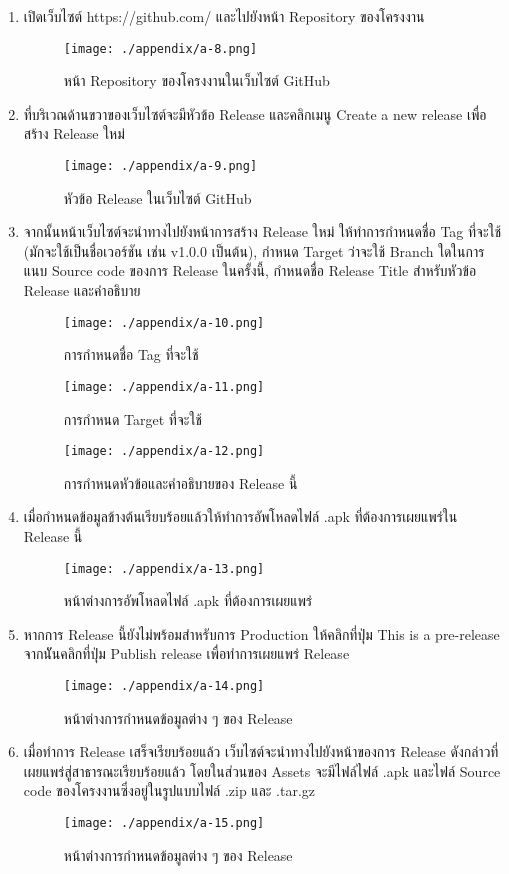 \begin{enumerate}
    \item เปิดเว็บไซต์ https://github.com/ และไปยังหน้า Repository ของโครงงาน
    \begin{figure}
        \texttt{[image: ./appendix/a-8.png]}
        \caption{หน้า Repository ของโครงงานในเว็บไซต์ GitHub}
    \end{figure}
    \item ที่บริเวณด้านขวาของเว็บไซต์จะมีหัวข้อ Release และคลิกเมนู Create a new release เพื่อสร้าง Release ใหม่
    \begin{figure}
        \texttt{[image: ./appendix/a-9.png]}
        \caption{หัวข้อ Release ในเว็บไซต์ GitHub}
    \end{figure}
    \item จากนั้นหน้าเว็บไซต์จะนำทางไปยังหน้าการสร้าง Release ใหม่ ให้ทำการกำหนดชื่อ Tag ที่จะใช้ (มักจะใช้เป็นชื่อเวอร์ชัน เช่น v1.0.0 เป็นต้น), กำหนด Target ว่าจะใช้ Branch ใดในการแนบ Source code ของการ Release ในครั้งนี้, กำหนดชื่อ Release Title สำหรับหัวข้อ Release และคำอธิบาย
    \begin{figure}
        \texttt{[image: ./appendix/a-10.png]}
        \caption{การกำหนดชื่อ Tag ที่จะใช้}
    \end{figure}
    \begin{figure}
        \texttt{[image: ./appendix/a-11.png]}
        \caption{การกำหนด Target ที่จะใช้}
    \end{figure}
    \begin{figure}
        \texttt{[image: ./appendix/a-12.png]}
        \caption{การกำหนดหัวข้อและคำอธิบายของ Release นี้}
    \end{figure}
    \item เมื่อกำหนดข้อมูลข้างต้นเรียบร้อยแล้วให้ทำการอัพโหลดไฟล์ .apk ที่ต้องการเผยแพร่ใน Release นี้
    \begin{figure}
        \texttt{[image: ./appendix/a-13.png]}
        \caption{หน้าต่างการอัพโหลดไฟล์ .apk ที่ต้องการเผยแพร่}
    \end{figure}
    \item หากการ Release นี้ยังไม่พร้อมสำหรับการ Production ให้คลิกที่ปุ่ม This is a pre-release จากนัันคลิกที่ปุ่ม Publish release เพื่อทำการเผยแพร่ Release
    \begin{figure}
        \texttt{[image: ./appendix/a-14.png]}
        \caption{หน้าต่างการกำหนดข้อมูลต่าง ๆ ของ Release}
    \end{figure}
    \item เมื่อทำการ Release เสร็จเรียบร้อยแล้ว เว็บไซต์จะนำทางไปยังหน้าของการ Release ดังกล่าวที่เผยแพร่สู่สาธารณะเรียบร้อยแล้ว โดยในส่วนของ Assets จะมีไฟล์ไฟล์ .apk และไฟล์ Source code ของโครงงานซึ่งอยู่ในรูปแบบไฟล์ .zip และ .tar.gz
    \begin{figure}
        \texttt{[image: ./appendix/a-15.png]}
        \caption{หน้าต่างการกำหนดข้อมูลต่าง ๆ ของ Release}
    \end{figure}
\end{enumerate}